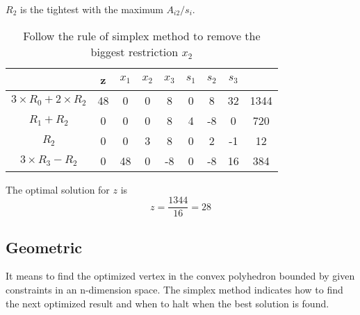 \documentclass[12pt,a4paper]{article}
\theoremstyle{definition}
\begin{document}
\newpage
\par $R_2$ is the tightest with the maximum $A_{i2}/s_i$. 
\begin{table}[h]
    \centering
    \begin{tabular}{|c|c|cccccc|c|}
    \hline
    & z & $x_1$ & $x_2$ & $x_3$ & $s_1$ & $s_2$ & $s_3$  &    \\ \hline
    $3\times R_0+2 \times R_2$& 48 & 0 & 0 & 8 & 0  & 8  & 32  & 1344  \\
    $R_1 + R_2$& 0 & 0  & 0  & 8  & 4  & -8  & 0   & 720 \\
    $R_2$& 0 & 0  & 3  & 8  & 0  & 2  & -1   & 12 \\
    $3 \times R_3-R_2$& 0 & 48  & 0  & -8  & 0  & -8  & 16   & 384 \\ \hline
    \end{tabular}
    \caption{Follow the rule of simplex method to remove the biggest restriction $x_2$}
\end{table}
\par The optimal solution for $z$ is
$$
z = \frac{1344}{16} = 28
$$

\subsection{Geometric}
It means to find the optimized vertex in the convex polyhedron bounded by given constraints in an n-dimension space. The simplex method indicates how to find the next optimized result and when to halt when the best solution is found.
\end{document}
